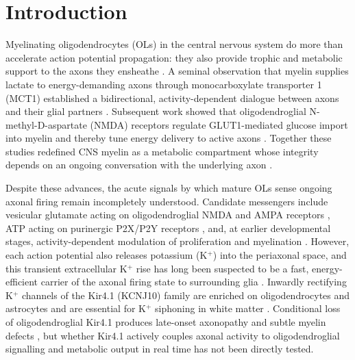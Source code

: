 \section{Introduction}

Myelinating oligodendrocytes (OLs) in the central nervous system do more than accelerate action potential propagation: they also provide trophic and metabolic support to the axons they ensheathe \citep{Nave2010,Simons2016,Philips2017}. A seminal observation that myelin supplies lactate to energy-demanding axons through monocarboxylate transporter 1 (MCT1) established a bidirectional, activity-dependent dialogue between axons and their glial partners \citep{Funfschilling2012,Lee2012}. Subsequent work showed that oligodendroglial N-methyl-D-aspartate (NMDA) receptors regulate GLUT1-mediated glucose import into myelin and thereby tune energy delivery to active axons \citep{Saab2016}. Together these studies redefined CNS myelin as a metabolic compartment whose integrity depends on an ongoing conversation with the underlying axon \citep{Brown2012,Trevisiol2017,Chamberlain2021}.

Despite these advances, the acute signals by which mature OLs sense ongoing axonal firing remain incompletely understood. Candidate messengers include vesicular glutamate acting on oligodendroglial NMDA and AMPA receptors \citep{Micu2006,Saab2016}, ATP acting on purinergic P2X/P2Y receptors \citep{Kettenmann2013}, and, at earlier developmental stages, activity-dependent modulation of proliferation and myelination \citep{Baraban2016,Suminaite2019}. However, each action potential also releases potassium (K$^+$) into the periaxonal space, and this transient extracellular K$^+$ rise has long been suspected to be a fast, energy-efficient carrier of the axonal firing state to surrounding glia \citep{Kofuji2000,Bay2012,Olsen2015}. Inwardly rectifying K$^+$ channels of the Kir4.1 (KCNJ10) family are enriched on oligodendrocytes and astrocytes \citep{Neusch2001,Djukic2007,Larson2018} and are essential for K$^+$ siphoning in white matter \citep{Larson2018,Tong2014}. Conditional loss of oligodendroglial Kir4.1 produces late-onset axonopathy and subtle myelin defects \citep{Schirmer2018,Stumpf2019,Battefeld2019}, but whether Kir4.1 actively couples axonal activity to oligodendroglial signalling and metabolic output in real time has not been directly tested.

